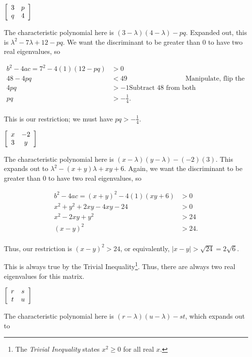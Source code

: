 \documentclass[../key.tex]{subfiles}
\begin{document}
\begin{iinner_problem}[start=1]
\item $\left[\begin{array}{cc} 3 & p \\ q & 4 \end{array}\right]$
\end{iinner_problem}

The characteristic polynomial here is $(3-\lambda)(4-\lambda)-pq$. Expanded out, this is $\lambda^2 - 7\lambda + 12 - pq$. We want the discriminant to be greater than $0$ to have two real eigenvalues, so

\begin{align*}
b^2-4ac=7^2-4(1)(12-pq) &> 0 \\
48-4pq &< 49 & \text{Manipulate, flip the inequality}\\
4pq &> -1 \text{Subtract 48 from both sides}\\
pq &> -\frac{1}{4}. \\
\end{align*}

This is our restriction; we must have $pq>-\frac{1}{4}$.

\begin{iinner_problem}
\item $\left[\begin{array}{cc} x & -2 \\ 3 & y \end{array}\right]$
\end{iinner_problem}

The characteristic polynomial here is $(x-\lambda)(y-\lambda)-(-2)(3)$. This expands out to $\lambda^2 - (x+y)\lambda + xy + 6$. Again, we want the discriminant to be greater than $0$ to have two real eigenvalues, so

\begin{align*}
b^2-4ac=(x+y)^2-4(1)(xy+6) &> 0 \\
x^2 + y^2 + 2xy - 4xy - 24 &> 0 \\
x^2 - 2xy + y^2 &> 24 \\
(x-y)^2 &> 24. \\
\end{align*}

Thus, our restriction is $(x-y)^2 > 24$, or equivalently, $|x-y| > \sqrt{24} = 2\sqrt{6}.$

This is always true by the Trivial Inequality\footnote{The \textit{Trivial Inequality} states $x^2\geq 0$ for all real $x$.}. Thus, there are always two real eigenvalues for this matrix.

\begin{iinner_problem}
\item $\left[\begin{array}{cc} r & s \\ t & u \end{array}\right]$
\end{iinner_problem}

The characteristic polynomial here is $(r-\lambda)(u-\lambda)-st$, which expands out to
\end{document}
